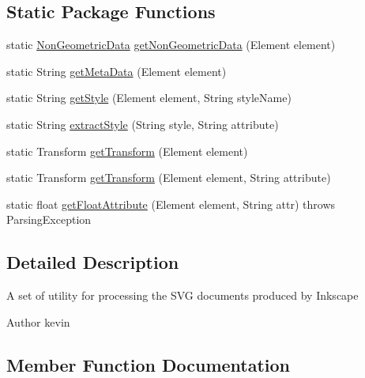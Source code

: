 \subsection*{Static Package Functions}
\begin{DoxyCompactItemize}
\item 
static \mbox{\hyperlink{classorg_1_1newdawn_1_1slick_1_1svg_1_1_non_geometric_data}{Non\+Geometric\+Data}} \mbox{\hyperlink{classorg_1_1newdawn_1_1slick_1_1svg_1_1inkscape_1_1_util_aa784c3edeb4aad8fc26ec54e4f8c7d04}{get\+Non\+Geometric\+Data}} (Element element)
\item 
static String \mbox{\hyperlink{classorg_1_1newdawn_1_1slick_1_1svg_1_1inkscape_1_1_util_a93a7132a1178ccfeb1341987b00ef513}{get\+Meta\+Data}} (Element element)
\item 
static String \mbox{\hyperlink{classorg_1_1newdawn_1_1slick_1_1svg_1_1inkscape_1_1_util_a868edc35f1d8da87bfbc5cff12514217}{get\+Style}} (Element element, String style\+Name)
\item 
static String \mbox{\hyperlink{classorg_1_1newdawn_1_1slick_1_1svg_1_1inkscape_1_1_util_a97d0515ddad8d405e9770c1f1d1592e0}{extract\+Style}} (String style, String attribute)
\item 
static Transform \mbox{\hyperlink{classorg_1_1newdawn_1_1slick_1_1svg_1_1inkscape_1_1_util_a96fccbd8e9ba06987f1e5d978f2b9ff4}{get\+Transform}} (Element element)
\item 
static Transform \mbox{\hyperlink{classorg_1_1newdawn_1_1slick_1_1svg_1_1inkscape_1_1_util_ae45ba35602eb8b3071c732e60edf609d}{get\+Transform}} (Element element, String attribute)
\item 
static float \mbox{\hyperlink{classorg_1_1newdawn_1_1slick_1_1svg_1_1inkscape_1_1_util_a263828dc423a571645718f7413f83cf9}{get\+Float\+Attribute}} (Element element, String attr)  throws Parsing\+Exception 
\end{DoxyCompactItemize}


\subsection{Detailed Description}
A set of utility for processing the S\+VG documents produced by Inkscape

\begin{DoxyAuthor}{Author}
kevin 
\end{DoxyAuthor}


\subsection{Member Function Documentation}
\mbox{\label{classorg_1_1newdawn_1_1slick_1_1svg_1_1inkscape_1_1_util_a97d0515ddad8d405e9770c1f1d1592e0}} 
